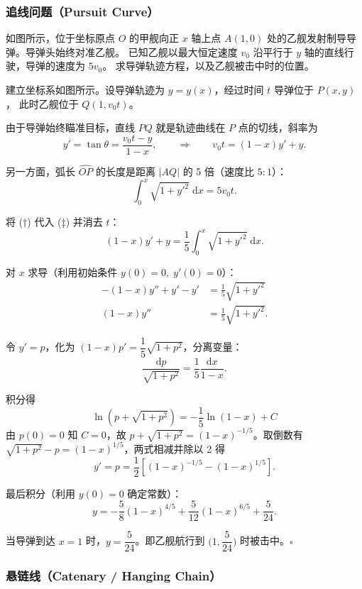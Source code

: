 \documentclass[lang=cn,11pt]{elegantbook}
\begin{document}
\subsubsection*{追线问题（Pursuit Curve）}

\begin{exercise}[导弹追击舰船] 
如图所示，位于坐标原点 $O$ 的甲舰向正 $x$ 轴上点 $A(1,0)$ 处的乙舰发射制导导弹。导弹头始终对准乙舰。
已知乙舰以最大恒定速度 $v_{0}$ 沿平行于 $y$ 轴的直线行驶，导弹的速度为 $5v_{0}$。
求导弹轨迹方程，以及乙舰被击中时的位置。
\end{exercise}

\begin{solution}
建立坐标系如图所示。设导弹轨迹为 $y=y(x)$，经过时间 $t$ 导弹位于 $P(x,y)$，
此时乙舰位于 $Q(1,v_{0}t)$。

由于导弹始终瞄准目标，直线 $PQ$ 就是轨迹曲线在 $P$ 点的切线，斜率为
\[
y'=\tan\theta=\frac{v_{0}t-y}{1-x},
\qquad\Longrightarrow\qquad v_{0}t=(1-x)y'+y. \tag{†}
\]

另一方面，弧长 $\widehat{OP}$ 的长度是距离 $|AQ|$ 的 5 倍（速度比 $5:1$）：
\[
\int_{0}^{x}\sqrt{1+y'^{2}}\;\mathrm{d}x=5v_{0}t. \tag{‡}
\]

将 (†) 代入 (‡) 并消去 $t$：
\[
(1-x)y'+y=\frac15\int_{0}^{x}\sqrt{1+y'^{2}}\;\mathrm{d}x. \tag{§}
\]

对 $x$ 求导（利用初始条件 $y(0)=0,\;y'(0)=0$）：
\begin{align*}
-(1-x)y''+y'-y' &=\frac15\sqrt{1+y'^{2}} \\
(1-x)y'' &=\frac15\sqrt{1+y'^{2}}.
\end{align*}

令 $y'=p$，化为 $(1-x)p'=\dfrac15\sqrt{1+p^{2}}$，分离变量：
\[
\frac{\mathrm{d}p}{\sqrt{1+p^{2}}}=\frac{1}{5}\frac{\mathrm{d}x}{1-x}.
\]

积分得 
\[
\ln(p+\sqrt{1+p^{2}})=-\frac15\ln(1-x)+C
\]
由 $p(0)=0$ 知 $C=0$，故
$p+\sqrt{1+p^{2}}=(1-x)^{-1/5}$。取倒数有 $\sqrt{1+p^{2}}-p=(1-x)^{1/5}$，两式相减并除以 2 得
\[
y'=p=\frac12\!\left[(1-x)^{-1/5}-(1-x)^{1/5}\right].
\]

最后积分（利用 $y(0)=0$ 确定常数）：
\[
\boxed{
y=-\frac58(1-x)^{4/5}+\frac5{12}(1-x)^{6/5}+\frac{5}{24}.
}
\]

当导弹到达 $x=1$ 时，$y=\dfrac5{24}$。即乙舰航行到 $\bigl(1,\dfrac{5}{24}\bigr)$ 时被击中。\hfill$\square$
\end{solution}


\subsubsection*{悬链线（Catenary / Hanging Chain）}
\end{document}
